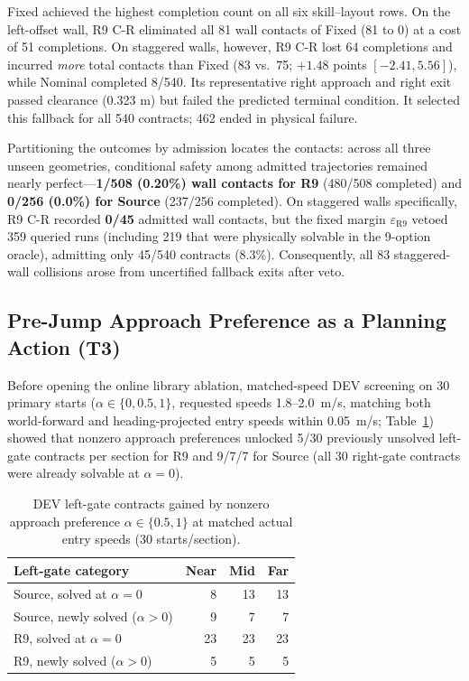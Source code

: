 \documentclass[letterpaper,10pt,conference]{ieeeconf}
\begin{document}
Fixed achieved the highest completion count on all six skill--layout rows. On the left-offset wall, R9 C-R eliminated all 81 wall contacts of Fixed (81 to 0) at a cost of 51 completions. On staggered walls, however, R9 C-R lost 64 completions and incurred \emph{more} total contacts than Fixed (83 vs.\ 75; $+1.48$ points $[-2.41,5.56]$), while Nominal completed 8/540. Its representative right approach and right exit passed clearance (0.323 m) but failed the predicted terminal condition. It selected this fallback for all 540 contracts; 462 ended in physical failure.

Partitioning the outcomes by admission locates the contacts: across all three unseen geometries, conditional safety among admitted trajectories remained nearly perfect---\textbf{1/508 (0.20\%) wall contacts for R9} (480/508 completed) and \textbf{0/256 (0.0\%) for Source} (237/256 completed). On staggered walls specifically, R9 C-R recorded \textbf{0/45} admitted wall contacts, but the fixed margin $\varepsilon_{\mathrm{R9}}$ vetoed 359 queried runs (including 219 that were physically solvable in the 9-option oracle), admitting only 45/540 contracts (8.3\%). Consequently, all 83 staggered-wall collisions arose from uncertified fallback exits after veto.

\subsection{Pre-Jump Approach Preference as a Planning Action (T3)}
Before opening the online library ablation, matched-speed DEV screening on 30 primary starts ($\alpha\in\{0,0.5,1\}$, requested speeds 1.8--2.0~m/s, matching both world-forward and heading-projected entry speeds within 0.05~m/s; Table~\ref{tab:dev_alpha}) showed that nonzero approach preferences unlocked 5/30 previously unsolved left-gate contracts per section for R9 and 9/7/7 for Source (all 30 right-gate contracts were already solvable at $\alpha=0$).

\begin{table}[t]\centering
\caption{DEV left-gate contracts gained by nonzero approach preference $\alpha\in\{0.5,1\}$ at matched actual entry speeds (30 starts/section).}
\footnotesize\begin{tabular}{lrrr}\toprule
Left-gate category & Near & Mid & Far\\\midrule
Source, solved at $\alpha=0$ & 8 & 13 & 13\\
Source, newly solved ($\alpha>0$) & 9 & 7 & 7\\
R9, solved at $\alpha=0$ & 23 & 23 & 23\\
R9, newly solved ($\alpha>0$) & 5 & 5 & 5\\\bottomrule
\end{tabular}\label{tab:dev_alpha}
\end{table}
\end{document}

